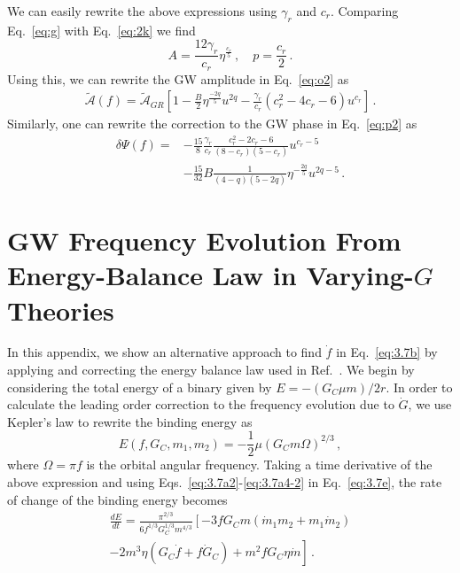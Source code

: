 \documentclass[prd,twocolumn,nofootinbib]{revtex4-1}
\begin{document}
We can easily rewrite the above expressions using $\gamma_r$ and $c_r$. 
Comparing Eq.~\eqref{eq:g} with Eq.~\eqref{eq:2k} we find
\begin{equation}\label{eq:i}
A=\frac{12\gamma_r}{c_r}\eta^{\frac{c_r}{5}}\,, \quad p=\frac{c_r}{2}\,.
\end{equation}
Using this, we can rewrite the GW amplitude in Eq.~\eqref{eq:o2} as
\begin{align}\label{eq:o}
\tilde{\mathcal{A}}(f)=\tilde{\mathcal{A}}_{GR} \left[1-\frac{B}{2}\eta^{\frac{-2q}{5}}u^{2q}-\frac{\gamma_r}{c_r}(c^2_r-4c_r-6)u^{c_r}\right]\,.
\end{align}
Similarly, one can rewrite the correction to the GW phase in Eq.~\eqref{eq:p2} as
\begin{align}\label{eq:p}
\delta\Psi(f)=&-\frac{15}{8}\frac{\gamma_r}{c_r}\frac{c_r^2-2c_r-6}{(8-c_r)(5-c_r)}u^{c_r-5}\nonumber\\ &-\frac{15}{32}B\frac{1}{(4-q)(5-2q)}\eta^{-\frac{2q}{5}}u^{2q-5}\,.
 \end{align}

\section{GW Frequency Evolution From Energy-Balance Law in Varying-$G$ Theories} \label{appendix_2}
In this appendix, we show an alternative approach to find $\dot f$ in Eq.~\eqref{eq:3.7b} by applying and correcting the energy balance law used in Ref.~\cite{Yunes:2009bv}. We begin by considering the total energy of a binary given by $E=-(G_C\mu m)/2r$. In order to calculate the leading order correction to the frequency evolution due to $\dot G$, we  use Kepler's law to rewrite the binding energy as 
 \begin{equation}\label{eq:3.7e}
 E(f,G_C,m_1,m_2)=-\frac{1}{2}\mu (G_Cm\Omega)^{2/3}\,,
 \end{equation}
 where $\Omega=\pi f$ is the orbital angular frequency. Taking a time derivative of the above expression and using Eqs.~\eqref{eq:3.7a2}-\eqref{eq:3.7a4-2} in Eq.~\eqref{eq:3.7e}, the rate of change of the binding energy becomes
 \begin{align}\label{eq:3.7j}
 \frac{d E}{d t}=\frac{\pi^{2/3}}{6f^{1/3}G_C^{1/3}m^{4/3}}\left[-3fG_Cm(\dot{m}_1m_2+m_1\dot{m}_2)\right.\nonumber\\ \left.-2m^3\eta(G_C\dot{f}+f\dot{G}_C)+m^2fG_C\eta\dot{m}\right]\,.
 \end{align}
 
\end{document}
